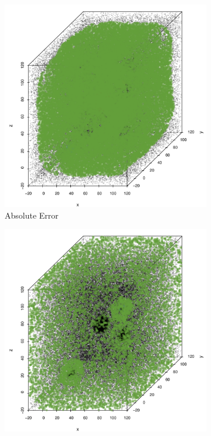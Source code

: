 		\begin{figure}
			\centering
			\begin{subfigure}{0.23\textwidth}
				\centering
				\includegraphics[keepaspectratio=true, width=\textwidth, height=0.23\textheight]{discussion/img/ferdosi_3_more_noise_abs_error_mbeSmallerThansambe.png}
				\caption{Absolute Error}
				\label{fig:discussion:ferdosi3Noise:mbeLowerError}
			\end{subfigure}		
			\begin{subfigure}{0.23\textwidth}
				\centering
				\includegraphics[keepaspectratio=true, width=\textwidth, height=0.23\textheight]{discussion/img/ferdosi_3_more_noise_anisotropy.png}

\end{subfigure}
\end{figure}
